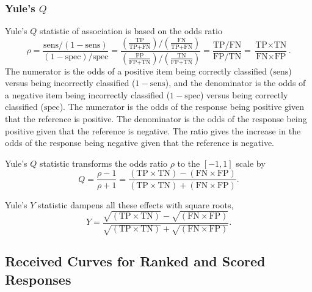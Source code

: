 \subsubsection{Yule's $Q$}

Yule's $Q$ statistic of association is based on the odds ratio
%
\begin{equation}
\rho 
= \frac{\mbox{sens}/(1 - \mbox{sens})}
       {(1 - \mbox{spec})/\mbox{spec}}
= \frac{\left( \frac{\mbox{TP}}{\mbox{TP}+\mbox{FN}} \right) \Big/ \left( \frac{\mbox{FN}}{\mbox{TP}+\mbox{FN}} \right) }
       {\left( \frac{\mbox{FP}}{\mbox{FP}+\mbox{TN}} \right) \Big/ \left( \frac{\mbox{TN}}{\mbox{FP}+\mbox{TN}} \right) }
= \frac{\mbox{TP}/\mbox{FN}}{\mbox{FP}/\mbox{TN}}
= \frac{\mbox{TP} \times \mbox{TN}}{\mbox{FN} \times \mbox{FP}}.
\end{equation}
%
The numerator is the odds of a positive item being correctly
classified ($\mbox{sens}$) versus being incorrectly classified ($1 -
\mbox{sens}$), and the denominator is the odds of a negative item
being incorrectly classified ($1 - \mbox{spec}$) versus being
correctly classified ($\mbox{spec}$).  The numerator is the odds of
the response being positive given that the reference is positive.  The
denominator is the odds of the response being positive given that the
reference is negative.  The ratio gives the increase in the odds
of the response being negative given that the reference is negative.

Yule's $Q$ statistic transforms the odds ratio $\rho$ to the $[-1,1]$
scale by
%
\begin{equation}
Q 
= \frac{\rho - 1}{\rho + 1}
= \frac{\left( \mbox{TP} \times \mbox{TN} \right) 
        - \left( \mbox{FN} \times \mbox{FP} \right)}
       {\left( \mbox{TP} \times \mbox{TN} \right) 
        + \left( \mbox{FN} \times \mbox{FP} \right)}.
\end{equation}

Yule's $Y$ statistic dampens all these effects with square roots,
%
\begin{equation}
Y
= \frac{\sqrt{\left( \mbox{TP} \times \mbox{TN} \right)}
        - \sqrt{\left( \mbox{FN} \times \mbox{FP} \right)}}
       {\sqrt{\left( \mbox{TP} \times \mbox{TN} \right)}
         + \sqrt{\left( \mbox{FN} \times \mbox{FP} \right)}}.
\end{equation}


\subsection{Received Curves for Ranked and Scored Responses}

